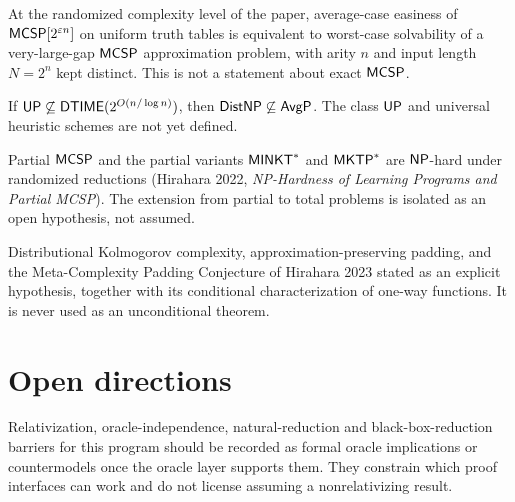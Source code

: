\begin{theorem}
  \label{thm:avg-mcsp-route}
  \notready
  At the randomized complexity level of the paper, average-case easiness of
  $\mathsf{MCSP}[2^{\varepsilon n}]$ on uniform truth tables is equivalent to
  worst-case solvability of a very-large-gap $\mathsf{MCSP}$ approximation problem,
  with arity $n$ and input length $N = 2^n$ kept distinct. This is not a
  statement about exact $\mathsf{MCSP}$.
\end{theorem}

\begin{theorem}
  \label{thm:avg-up-dtime}
  \notready
  If $\mathsf{UP} \not\subseteq \mathsf{DTIME}(2^{O(n/\log n)})$, then $\mathsf{DistNP}
  \not\subseteq \mathsf{AvgP}$. The class $\mathsf{UP}$ and universal heuristic schemes
  are not yet defined.
\end{theorem}

\begin{theorem}
  \label{thm:avg-partial-hard}
  \notready
  Partial $\mathsf{MCSP}$ and the partial variants $\mathsf{MINKT}^{*}$ and
  $\mathsf{MKTP}^{*}$ are $\mathsf{NP}$-hard under randomized reductions (Hirahara 2022,
  \emph{NP-Hardness of Learning Programs and Partial MCSP}). The extension from
  partial to total problems is isolated as an open hypothesis, not assumed.
\end{theorem}

\begin{definition}
  \label{def:avg-padding}
  \notready
  Distributional Kolmogorov complexity, approximation-preserving padding, and
  the Meta-Complexity Padding Conjecture of Hirahara 2023 stated as an explicit
  hypothesis, together with its conditional characterization of one-way
  functions. It is never used as an unconditional theorem.
\end{definition}

\section{Open directions}

Relativization, oracle-independence, natural-reduction and black-box-reduction
barriers for this program should be recorded as formal oracle implications or
countermodels once the oracle layer supports them. They constrain which proof
interfaces can work and do not license assuming a nonrelativizing result.
